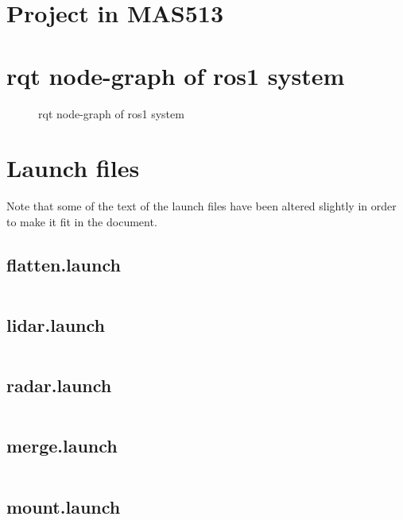 \appendix

\chapter{Project in MAS513}
\label{Appdix:MAS513}
 

\chapter{rqt node-graph of ros1 system}
\label{Appdix:rqtROS1NB}
\newpage
\begin{figure}[H]

  \caption{rqt node-graph of ros1 system}
  \label{fig:Appdix:rqt:ros1_noBridge}
\end{figure}

\chapter{Launch files}
Note that some of the text of the launch files have been altered slightly in order to make it fit in the document.
\section{flatten.launch}
\label{Appdix:flatten.launch}
\inputminted{xml}{ros_system/launch/src/sublaunch/flatten.launch}

\section{lidar.launch}
\label{Appdix:lidar.launch}
\inputminted{xml}{ros_system/launch/src/sublaunch/lidar.launch}

\section{radar.launch}
\label{Appdix:radar.launch}
\inputminted{xml}{ros_system/launch/src/sublaunch/radar.launch}

\section{merge.launch}
\label{Appdix:merge.launch}
\inputminted{xml}{ros_system/launch/src/sublaunch/merge.launch}

\section{mount.launch}
\label{Appdix:mount.launch}
\inputminted{xml}{ros_system/launch/src/sublaunch/mount.launch}

